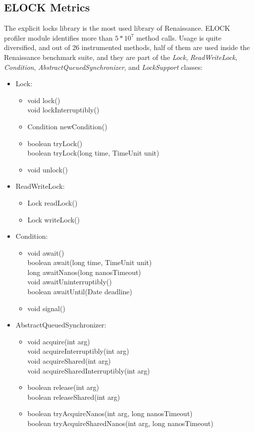 \documentclass[]{usiinfthesis}
\begin{document}
\subsection{ELOCK Metrics}
The explicit locks library is the most used library of Renaissance. ELOCK profiler module  identifies more than \(5*10^7\) method calls. Usage is quite diversified, and out of 26 instrumented methods, half of them are used inside the Renaissance benchmark suite, and they are part of the \textit{Lock}, \textit{ReadWriteLock}, \textit{Condition}, \textit{AbstractQueuedSynchronizer}, and \textit{LockSupport} classes:
\begin{itemize}
\item Lock:
    \begin{itemize}
        \item   void lock()
         \mbox{}\\ void lockInterruptibly()
        \item   Condition newCondition()
        \item   boolean tryLock()
         \mbox{}\\ boolean tryLock(long time, TimeUnit unit)
        \item   void unlock()
    \end{itemize}
\item ReadWriteLock:
\begin{itemize}
    \item   Lock readLock()
    \item   Lock writeLock()
\end{itemize}

\item Condition:
    \begin{itemize}
        \item   void await()
         \mbox{}\\ boolean await(long time, TimeUnit unit)
         \mbox{}\\ long awaitNanos(long nanosTimeout)
         \mbox{}\\ void awaitUninterruptibly()
         \mbox{}\\ boolean awaitUntil(Date deadline)
        \item   void signal()
    \end{itemize}

\item AbstractQueuedSynchronizer:
    \begin{itemize}
        \item   void acquire(int arg)
         \mbox{}\\ void acquireInterruptibly(int arg)
         \mbox{}\\ void acquireShared(int arg)
         \mbox{}\\ void acquireSharedInterruptibly(int arg)
        \item   boolean release(int arg)
         \mbox{}\\ boolean releaseShared(int arg)
        \item   boolean tryAcquireNanos(int arg, long nanosTimeout)
         \mbox{}\\ boolean tryAcquireSharedNanos(int arg, long nanosTimeout)
    \end{itemize}


\end{itemize}
\end{document}
